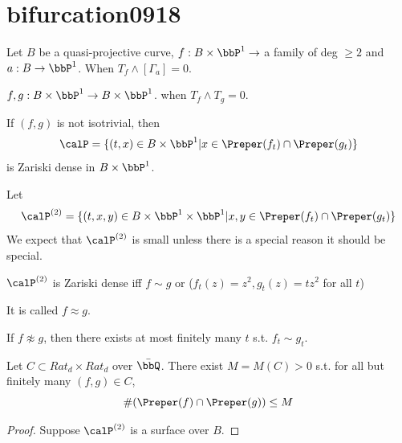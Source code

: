 \section{bifurcation0918}

\begin{question}[label=\labelNFM{ques:2.1}, status=draft, tag=0000000]
	Let $B$ be a quasi-projective curve, $f:B \times \bbP^1 \to $ a family of deg $\geq 2$ and $a: B \to \bbP^1$.
	When $T_f \wedge [\Gamma_a] = 0$.
\end{question}

\begin{question}[label=\labelNFM{ques:3}, status=draft, tag=0000000]
	$f,g: B \times \bbP^1 \to B \times \bbP^1$. when $T_f \wedge T_g = 0$.
\end{question}

\begin{theorem}[label=\labelNFM{thm:1}, status=draft, tag=0000000]
	If $(f,g)$ is not isotrivial, then
	\[ \calP = \{(t,x) \in B \times \bbP^1 | x \in \Preper(f_t) \cap \Preper(g_t) \} \]
	is Zariski dense in $B \times \bbP^1$.
\end{theorem}

Let
\[ \calP^{(2)} = \{(t,x,y) \in B \times \bbP^1 \times \bbP^1 | x,y \in \Preper(f_t) \cap \Preper(g_t) \} \]
We expect that $\calP^{(2)}$ is small unless there is a special reason it should be special.

\begin{theorem}[label=\labelNFM{thm:3}, status=draft, tag=0000000]
	$\calP^{(2)}$ is Zariski dense iff $f \sim g$ or ($f_t(z)=z^2, g_t(z)=tz^2$ for all $t$)
\end{theorem}
It is called $f \approx g$.

\begin{corollary}[label=\labelNFM{cor:1}, status=draft, tag=0000000]
	If $f \not\approx g$, then there exists at most finitely many $t$ s.t. $f_t \sim g_t$.
\end{corollary}

\begin{corollary}[label=\labelNFM{cor:2}, status=draft, tag=0000000]
	Let $C \subset Rat_d \times Rat_d$ over $\bar{\bbQ}$.
	There exist $M = M(C) > 0$ s.t. for all but finitely many $(f,g) \in C$,
	\[ \# ( \Preper(f) \cap \Preper(g) ) \leq M \]
\end{corollary}
\begin{proof}
	Suppose $\calP^{(2)}$ is a surface over $B$.
\end{proof}





